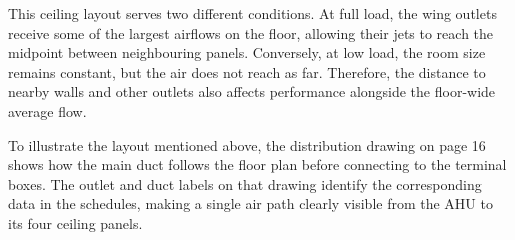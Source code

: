 This ceiling layout serves two different conditions. At full load, the wing outlets receive some of the largest airflows on the floor, allowing their jets to reach the midpoint between neighbouring panels. Conversely, at low load, the room size remains constant, but the air does not reach as far. Therefore, the distance to nearby walls and other outlets also affects performance alongside the floor-wide average flow.

To illustrate the layout mentioned above, the distribution drawing on page 16 shows how the main duct follows the floor plan before connecting to the terminal boxes. The outlet and duct labels on that drawing identify the corresponding data in the schedules, making a single air path clearly visible from the AHU to its four ceiling panels.
